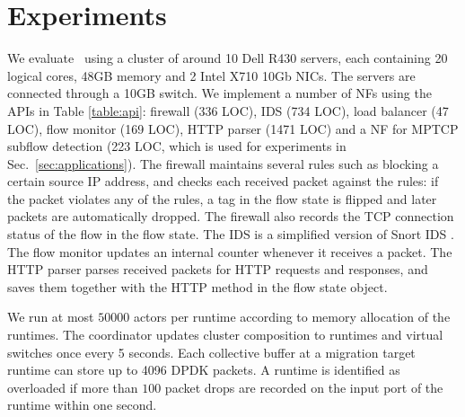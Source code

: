 \section{Experiments}
\label{sec:experiments}


We evaluate \nfactor~using a cluster of around 10 Dell R430 servers, each containing 20 logical cores, 48GB memory and 2 Intel X710 10Gb NICs. The servers are connected through a 10GB switch. We implement a number of NFs using the APIs in Table \ref{table:api}: firewall (336 LOC), IDS (734 LOC), load balancer (47 LOC), flow monitor (169 LOC), HTTP parser (1471 LOC) and a NF for MPTCP subflow detection (223 LOC, which is used for experiments in Sec.~\ref{sec:applications}). %
The firewall maintains several rules such as blocking a certain source IP address,
and checks each received packet against the rules: if the packet violates any of the rules, a tag in the flow state is flipped and later packets are automatically dropped. The firewall also records the TCP connection status of the flow in the flow state. The IDS is a simplified version of Snort IDS \cite{snort}.
The flow monitor updates an internal counter whenever it receives a packet. The HTTP parser parses received packets for HTTP requests and responses, and saves them together with the HTTP method in the flow state object. %

We run at most $50000$ actors per runtime according to memory allocation of the runtimes. %
The coordinator updates cluster composition to runtimes and virtual switches once every 5 seconds.
Each collective buffer at a migration target runtime can store up to 4096 DPDK packets. A runtime is identified as overloaded if more than $100$ packet drops are recorded on the input port of the runtime within one second.

